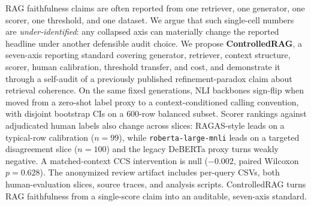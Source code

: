 RAG faithfulness claims are often reported from one retriever, one
generator, one scorer, one threshold, and one dataset. We argue that
such single-cell numbers are \emph{under-identified}: any collapsed
axis can materially change the reported headline under another
defensible audit choice. We propose \textbf{ControlledRAG}, a
seven-axis reporting standard covering generator, retriever, context
structure, scorer, human calibration, threshold transfer, and cost,
and demonstrate it through a self-audit of a previously published
refinement-paradox claim about retrieval coherence. On the same fixed
generations, NLI backbones sign-flip when moved from a zero-shot label
proxy to a context-conditioned calling convention, with disjoint
bootstrap CIs on a $600$-row balanced subset. Scorer rankings against
adjudicated human labels also change across slices: RAGAS-style leads
on a typical-row calibration ($n{=}99$), while
\texttt{roberta-large-mnli} leads on a targeted disagreement slice
($n{=}100$) and the legacy DeBERTa proxy turns weakly negative. A
matched-context CCS intervention is null ($-0.002$, paired Wilcoxon
$p{=}0.628$). The anonymized review artifact includes per-query CSVs,
both human-evaluation slices, source traces, and analysis scripts.
ControlledRAG turns RAG faithfulness from a single-score claim into an
auditable, seven-axis standard.
